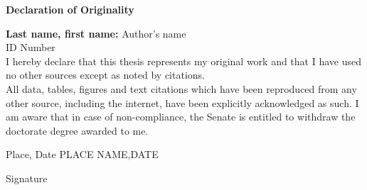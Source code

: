 \thispagestyle{empty}
\begin{center}
	\Large\textbf{Declaration of Originality}
\end{center}

\vspace{.5in}
\noindent\textbf{Last name, first name:}\hspace{.5in} Author's name\\
\doublespacing
{}\hspace{.4in} ID Number
\\


\vspace{.6in}
\noindent 
 I hereby declare that this thesis represents my original work and that I have used no other sources except as noted by citations.\\
 
 \noindent
 All data, tables, figures and text citations which have been reproduced from any other source, including the internet, have been explicitly acknowledged as such. I am aware that in case of non-compliance, the Senate is entitled to withdraw the doctorate degree awarded to me.
 
 \noindent
 \vfill
 Place, Date \hspace{1in}  PLACE NAME,DATE
 
 \vfill
 

 \noindent
 Signature\vfill
\blankpage
